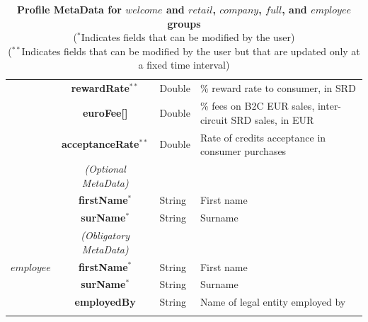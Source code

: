 \begin{table}[H]
\begin{centering}
{\begin{tabular}{ r | c | l | l }
			& {\bf rewardRate}$^{**}$		&Double	& \% reward rate to consumer, in SRD \\
			& {\bf euroFee[]}			&Double	& \% fees on B2C EUR sales, inter-circuit SRD sales, in EUR \\
			& {\bf acceptanceRate}$^{**}$	&Double	& Rate of credits acceptance in consumer purchases\\
\cline{2-2}
			 & \emph{(Optional MetaData)}& & \\
\cline{2-2}
			& {\bf firstName}$^*$			&String	& First name \\
			& {\bf surName}$^*$			&String	& Surname \\
\Xhline{1.5pt}
			& \emph{(Obligatory MetaData)} & & \\
\cline{2-2}
$employee$	& {\bf firstName}$^*$			&String	& First name \\
			& {\bf surName}$^*$			&String	& Surname \\
			& {\bf employedBy}			&String	& Name of legal entity employed by \\
\Xhline{1.5pt}
\end{tabular}
}
\caption{\small\textbf{Profile MetaData for $welcome$ and $retail$, $company$, $full$, and $employee$ groups}\\
($^*$Indicates fields that can be modified by the user)\\
($^{**}$Indicates fields that can be modified by the user but that are updated only at a fixed time interval)}
\label{tab:ProfileMetaData1}
\end{centering}
\end{table}


